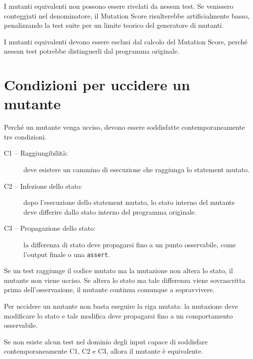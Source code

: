\begin{notaprof}
I mutanti equivalenti non possono essere rivelati da nessun test. Se venissero conteggiati nel denominatore, il Mutation Score risulterebbe artificialmente basso, penalizzando la test suite per un limite teorico del generatore di mutanti.
\end{notaprof}

\begin{notaesame}
I mutanti equivalenti devono essere esclusi dal calcolo del Mutation Score, perché nessun test potrebbe distinguerli dal programma originale.
\end{notaesame}

\section{Condizioni per uccidere un mutante}

Perché un mutante venga ucciso, devono essere soddisfatte contemporaneamente tre condizioni.

\begin{description}
    \item[C1 -- Raggiungibilità:] deve esistere un cammino di esecuzione che raggiunga lo statement mutato.

    \item[C2 -- Infezione dello stato:] dopo l'esecuzione dello statement mutato, lo stato interno del mutante deve differire dallo stato interno del programma originale.

    \item[C3 -- Propagazione dello stato:] la differenza di stato deve propagarsi fino a un punto osservabile, come l'output finale o una \texttt{assert}.
\end{description}

Se un test raggiunge il codice mutato ma la mutazione non altera lo stato, il mutante non viene ucciso. Se altera lo stato ma tale differenza viene sovrascritta prima dell'osservazione, il mutante continua comunque a sopravvivere.

\begin{notaesame}
Per uccidere un mutante non basta eseguire la riga mutata: la mutazione deve modificare lo stato e tale modifica deve propagarsi fino a un comportamento osservabile.
\end{notaesame}

\begin{notaesame}
Se non esiste alcun test nel dominio degli input capace di soddisfare contemporaneamente C1, C2 e C3, allora il mutante è equivalente.
\end{notaesame}

